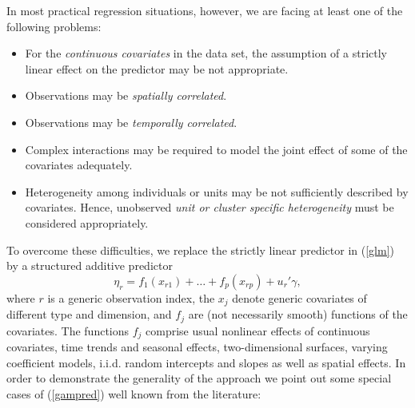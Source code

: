 \documentclass[11pt,a4paper,twoside]{bayesxarticle}
\begin{document}
In most practical regression situations, however, we are facing at
least one of the following problems:
\begin{itemize}
\item For the {\em continuous covariates} in the data set, the assumption of a strictly linear
effect on the predictor may be not appropriate. \vspace{-0.2cm}
\item Observations may be {\em spatially correlated}.
\vspace{-0.2cm}
\item Observations may be {\em temporally correlated}.
\vspace{-0.2cm}
\item Complex interactions may be required to model the joint effect
of some of the covariates adequately. \vspace{-0.2cm}
\item  Heterogeneity among individuals or units may be not sufficiently described by covariates. Hence,
unobserved {\em unit or cluster specific heterogeneity} must be
considered appropriately.
\end{itemize}
To overcome these difficulties, we replace the strictly linear
predictor in (\ref{glm}) by a structured additive predictor
\begin{equation}
\label{gampred}
\eta_{r}=f_{1}(x_{r1})+\dots+f_{p}(x_{rp})+u_r'\gamma,
\end{equation}
where $r$ is a generic observation index, the $x_j$ denote generic
covariates of different type and dimension, and $f_j$ are (not
necessarily smooth) functions of the covariates. The functions $f_j$
comprise usual nonlinear effects of continuous covariates, time
trends and seasonal effects, two-dimensional surfaces, varying
coefficient models, i.i.d. random intercepts and slopes as well as
spatial effects. In order to demonstrate the generality of the
approach we point out some special cases of (\ref{gampred}) well
known from the literature:
\end{document}
